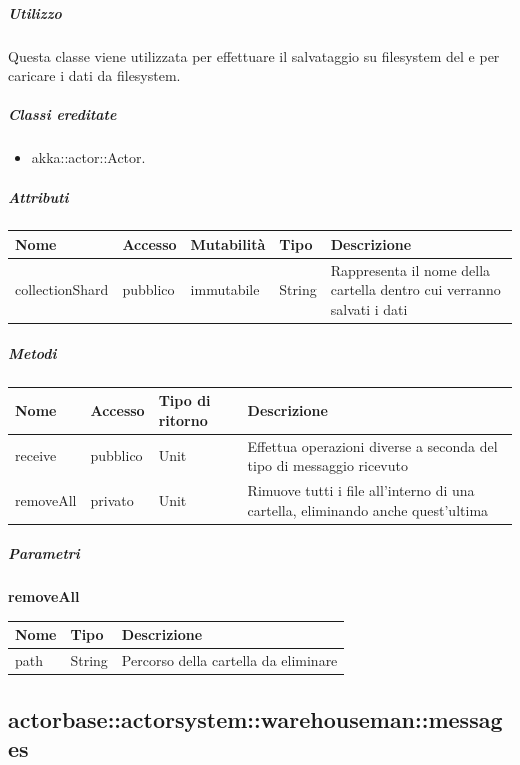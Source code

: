 \documentclass{scalatekids-article}
\begin{document}
\subparagraph{Utilizzo}

Questa classe viene utilizzata per effettuare il salvataggio su filesystem del
 e per caricare i dati da filesystem.

\subparagraph{Classi ereditate}

\begin{itemize}

\item akka::actor::Actor.

\end{itemize}

\subparagraph{Attributi}
\begin{tabular}{| p{3cm} | p{1.5cm} | p{2cm} | p{2cm} | p{8.5cm} |}
  \hline
  Nome & Accesso & Mutabilità & Tipo & Descrizione\\
  \hline
  collectionShard & pubblico & immutabile & String & Rappresenta il nome della cartella dentro cui verranno salvati i dati \\
  \hline
\end{tabular}

\subparagraph{Metodi}
\begin{tabular}{| l | l | l | l |}
  \hline
  Nome & Accesso & Tipo di ritorno & Descrizione\\
  \hline
  receive & pubblico & Unit & Effettua operazioni diverse a seconda del tipo di messaggio ricevuto \\
  \hline
  removeAll & privato & Unit & Rimuove tutti i file all'interno di una cartella, eliminando anche quest'ultima \\
  \hline
\end{tabular}

\subparagraph{Parametri}

\begin{center}
  \textbf{removeAll}\\
\end{center}
\begin{tabular}{| l | l | l |}
  \hline
  Nome & Tipo & Descrizione\\
  \hline
  path & String & Percorso della cartella da eliminare\\
  \hline
\end{tabular}

\subsection{actorbase::actorsystem::warehouseman::messages}
\label{sec:actorbase::actorsystem::warehouseman::messages}
\end{document}
